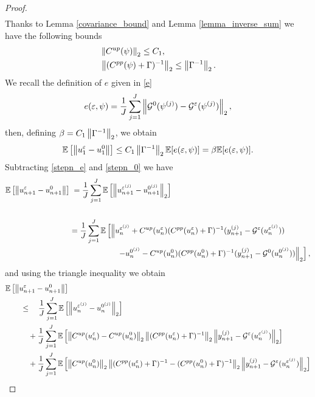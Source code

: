 \documentclass[10pt]{article}
\begin{document}
\begin{proof}
\begin{align*}
\end{align*}
Thanks to Lemma \ref{covariance_bound} and Lemma \ref{lemma_inverse_sum} we have the following bounds
\begin{align*}
& \left\|C^{up}(\psi)\right\|_2 \le C_1, \\
& \left\|(C^{pp}(\psi) + \Gamma)^{-1}\right\|_2 \le \left\|\Gamma^{-1}\right\|_2.
\end{align*}
We recall the definition of $e$ given in \eqref{e}
\[ e(\varepsilon, \psi) = \frac{1}{J} \sum_{j=1}^J \left\|\mathcal{G}^0(\psi^{(j)}) - \mathcal{G}^{\varepsilon}(\psi^{(j)})\right\|_2, \]
then, defining $\beta = C_1 \left\|\Gamma^{-1}\right\|_2$, we obtain
\begin{equation}
\label{bound0}
\mathbb{E} \left [ \left\|u_1^{\varepsilon} - u_1^0\right\| \right ] \le C_1 \left\|\Gamma^{-1}\right\|_2 \mathbb{E} [ e(\varepsilon, \psi) ] = \beta \mathbb{E} [ e(\varepsilon, \psi) ].
\end{equation}
Subtracting \eqref{stepn_e} and \eqref{stepn_0} we have
\begin{align*}
\mathbb{E} \left [ \left\|u_{n+1}^{\varepsilon} - u_{n+1}^0\right\| \right ] & \; = \frac{1}{J} \sum_{j=1}^J \mathbb{E} \left [ \left\|u_{n+1}^{\varepsilon^{(j)}} - u_{n+1}^{0^{(j)}}\right\|_2 \right ] \\ \\
& = \frac{1}{J} \sum_{j=1}^J \mathbb{E} \left [ \left \lVert u_{n}^{\varepsilon^{(j)}} + C^{up}(u_n^{\varepsilon}) (C^{pp}(u_n^{\varepsilon}) + \Gamma)^{-1} (y_{n+1}^{(j)} - \mathcal{G}^{\varepsilon}(u_n^{\varepsilon^{(j)}})) \right. \right. \\ 
& \hspace{60pt} \left. \left. - u_{n}^{0^{(j)}} - C^{up}(u_n^{0}) (C^{pp}(u_n^{0}) + \Gamma)^{-1} (y_{n+1}^{(j)} - \mathcal{G}^{0}(u_n^{0^{(j)}})) \right \rVert_2 \right ],
\end{align*}
and using the triangle inequality we obtain
\begin{align}
\nonumber
& \mathbb{E} \left [ \norm{u_{n+1}^{\varepsilon} - u_{n+1}^0} \right ] \\
\label{1}
& \qquad \le \quad \frac{1}{J} \sum_{j=1}^J \mathbb{E} \left [ \norm{u_n^{\varepsilon^{(j)}} - u_n^{0^{(j)}}}_2 \right ] \\ \label{2}
& \qquad \quad + \frac{1}{J} \sum_{j=1}^J \mathbb{E} \left [ \norm{C^{up}(u_n^{\varepsilon}) - C^{up}(u_n^0)}_2 \norm{(C^{pp}(u_n^{\varepsilon}) + \Gamma)^{-1}}_2 \norm{y_{n+1}^{(j)} - \mathcal{G}^{\varepsilon}(u_n^{\varepsilon^{(j)}})}_2 \right ] \\ \label{3}
& \qquad \quad + \frac{1}{J} \sum_{j=1}^J \mathbb{E} \left [ \norm{C^{up}(u_n^0)}_2 \norm{(C^{pp}(u_n^{\varepsilon}) + \Gamma)^{-1} - (C^{pp}(u_n^0) + \Gamma)^{-1}}_2 \norm{y_{n+1}^{(j)} - \mathcal{G}^{\varepsilon}(u_n^{\varepsilon^{(j)}})}_2 \right ] \\ \label{4}

\end{align}
\end{proof}
\end{document}
